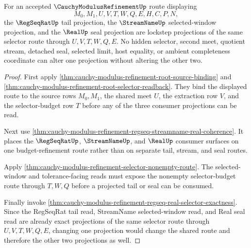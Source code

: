 \begin{theorem}
\label{thm:cauchy-modulus-refinement-regseq-real-selector-lockstep}
For an accepted $\CauchyModulusRefinementUp$ route displaying
$$
M_0,M_1,U,V,T,W,Q,E,H,C,P,N,
$$
the $\RegSeqRatUp$ tail projection, the $\StreamNameUp$ selected-window projection, and the $\RealUp$ seal projection are lockstep projections of the same selector route through $U,V,T,W,Q,E$. No hidden selector, second meet, quotient stream, detached seal, selected limit, host equality, or ambient completeness coordinate can alter one projection without altering the other two.
\end{theorem}
\begin{proof}
First apply \autoref{thm:cauchy-modulus-refinement-root-source-binding} and \autoref{thm:cauchy-modulus-refinement-root-selector-readback}. They bind the displayed route to the source rows $M_0,M_1$, the shared meet $U$, the extraction row $V$, and the selector-budget row $T$ before any of the three consumer projections can be read.

Next use \autoref{thm:cauchy-modulus-refinement-regseq-streamname-real-coherence}. It places the $\RegSeqRatUp$, $\StreamNameUp$, and $\RealUp$ consumer surfaces on one budget-refinement route rather than on separate tail, stream, and seal routes.

Apply \autoref{thm:cauchy-modulus-refinement-selector-nonempty-route}. The selected-window and tolerance-facing reads must expose the nonempty selector-budget route through $T,W,Q$ before a projected tail or seal can be consumed.

Finally invoke \autoref{thm:cauchy-modulus-refinement-regseq-real-selector-exactness}. Since the RegSeqRat tail read, StreamName selected-window read, and Real seal read are already exact projections of the same selector route through $U,V,T,W,Q,E$, changing one projection would change the shared route and therefore the other two projections as well.
\end{proof}

